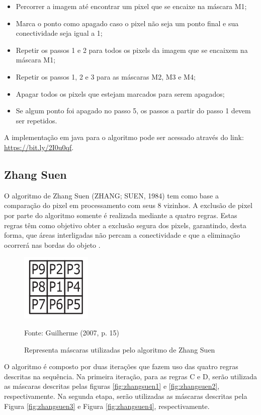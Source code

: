 \documentclass[
	12pt,				%
	oneside,			%
	a4paper,			%
	english,			%
	french,				%
	spanish,			%
	brazil,				%
	]{abntex2}
\begin{document}
\begin{itemize}
\item Percorrer a imagem até encontrar um pixel que se encaixe na máscara M1;
\item Marca o ponto como apagado caso o pixel não seja um ponto final e sua conectividade seja igual a 1;
\item Repetir os passos 1 e 2 para todos os pixels da imagem que se encaixem na máscara M1;
\item Repetir os passos 1, 2 e 3 para as máscaras M2, M3 e M4;
\item Apagar todos os pixels que estejam marcados para serem apagados;
\item Se algum ponto foi apagado no passo 5, os passos a partir do passo 1 devem ser repetidos.
\end{itemize}

A implementação em java para o algoritmo pode ser acessado através do link: \url{https://bit.ly/2I0u0qf}.

\subsection{Zhang Suen}

O algoritmo de Zhang Suen (ZHANG; SUEN, 1984) tem como base a comparação do pixel em processamento com seus 8 vizinhos. A exclusão de pixel por parte do algoritmo somente é realizada mediante a quatro regras. Estas regras têm como objetivo obter a exclusão segura dos pixels, garantindo, desta forma, que áreas interligadas não percam a conectividade e que a eliminação ocorrerá nas bordas do objeto \cite{guilherme:2007}.

\begin{figure}[ht]
\centering
\caption{Representa máscaras utilizadas pelo algoritmo de Zhang Suen}
\includegraphics[width=0.3\textwidth]{imagens/zhangsuen_mascara.png}

Fonte: Guilherme (2007, p. 15)
\label{fig:zhangsuen_mascara}
\end{figure}

O algoritmo é composto por duas iterações que fazem uso das quatro regras descritas na sequência. Na primeira iteração, para as regras C e D, serão utilizada as máscaras descritas pelas figuras  \ref{fig:zhangsuen1} e \ref{fig:zhangsuen2}, respectivamente. Na segunda etapa, serão utilizadas as máscaras descritas pela Figura \ref{fig:zhangsuen3} e Figura \ref{fig:zhangsuen4}, respectivamente.
\end{document}
